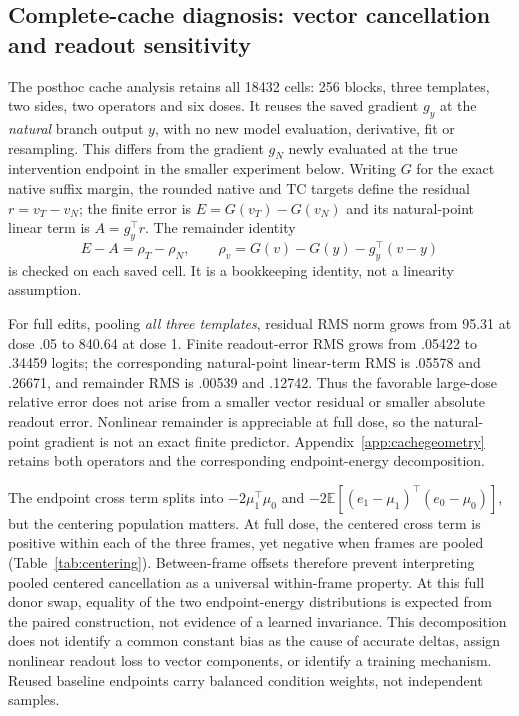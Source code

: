 \subsection{Complete-cache diagnosis: vector cancellation and readout sensitivity}
The posthoc cache analysis retains all 18432 cells: 256 blocks, three templates, two sides, two operators and six doses. It reuses the saved gradient $g_y$ at the \emph{natural} branch output $y$, with no new model evaluation, derivative, fit or resampling. This differs from the gradient $g_N$ newly evaluated at the true intervention endpoint in the smaller experiment below. Writing $G$ for the exact native suffix margin, the rounded native and TC targets define the residual $r=v_T-v_N$; the finite error is $E=G(v_T)-G(v_N)$ and its natural-point linear term is $A=g_y^\top r$. The remainder identity
\[
 E-A=\rho_T-\rho_N,\qquad
 \rho_v=G(v)-G(y)-g_y^\top(v-y)
\]
is checked on each saved cell. It is a bookkeeping identity, not a linearity assumption.

For full edits, pooling \emph{all three templates}, residual RMS norm grows from 95.31 at dose .05 to 840.64 at dose 1. Finite readout-error RMS grows from .05422 to .34459 logits; the corresponding natural-point linear-term RMS is .05578 and .26671, and remainder RMS is .00539 and .12742. Thus the favorable large-dose relative error does not arise from a smaller vector residual or smaller absolute readout error. Nonlinear remainder is appreciable at full dose, so the natural-point gradient is not an exact finite predictor. Appendix~\ref{app:cachegeometry} retains both operators and the corresponding endpoint-energy decomposition.

The endpoint cross term splits into $-2\mu_1^\top\mu_0$ and $-2\mathbb{E}[(e_1-\mu_1)^\top(e_0-\mu_0)]$, but the centering population matters. At full dose, the centered cross term is positive within each of the three frames, yet negative when frames are pooled (Table~\ref{tab:centering}). Between-frame offsets therefore prevent interpreting pooled centered cancellation as a universal within-frame property. At this full donor swap, equality of the two endpoint-energy distributions is expected from the paired construction, not evidence of a learned invariance. This decomposition does not identify a common constant bias as the cause of accurate deltas, assign nonlinear readout loss to vector components, or identify a training mechanism. Reused baseline endpoints carry balanced condition weights, not independent samples.


